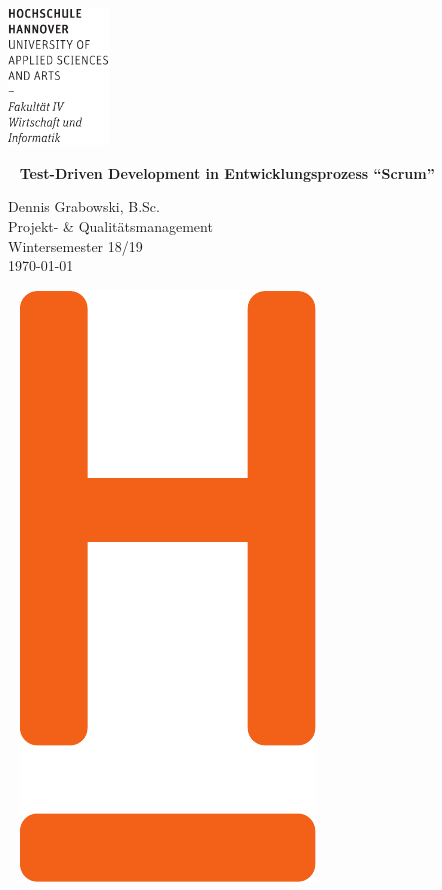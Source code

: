 \documentclass[12pt,DIV14,BCOR10mm,a4paper,twoside,parskip=half-,headsepline,headinclude,english,ngerman,bibliography=totocnumbered]{scrreprt}
\begin{document}
  \thispagestyle{empty} %
\includegraphics[width=0.2\textwidth]{Wortmarke_WI_schwarz}

   {  ~ \sffamily
  \vfill
  {\Huge\bfseries Test-Driven Development in Entwicklungsprozess \enquote{Scrum}}
  \bigskip

  {\Large
  Dennis Grabowski, B.Sc. \\[2ex]
  Projekt- \& Qualitätsmanagement \\
  Wintersemester 18/19
 \\[5ex]
   \today }
}
 \vfill

  ~ \hfill
  \includegraphics[height=0.3\paperheight]{H_WI_Pantone1665}

\vspace*{-3cm}
\end{document}
